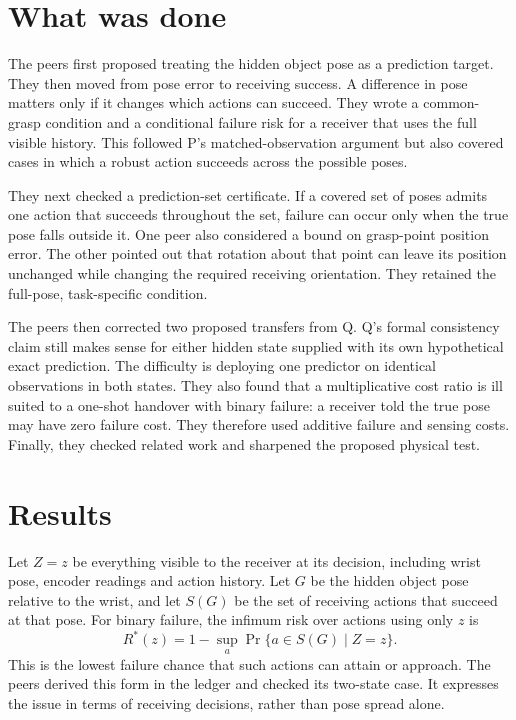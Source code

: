 \documentclass{article}
\begin{document}
\section{What was done}

The peers first proposed treating the hidden object pose as a prediction target. They then moved from
pose error to receiving success. A difference in pose matters only if it changes which actions can
succeed. They wrote a common-grasp condition and a conditional failure risk for a receiver that uses the
full visible history. This followed P's matched-observation argument but also covered cases in which a
robust action succeeds across the possible poses.

They next checked a prediction-set certificate. If a covered set of poses admits one action that succeeds
throughout the set, failure can occur only when the true pose falls outside it. One peer also considered
a bound on grasp-point position error. The other pointed out that rotation about that point can leave its
position unchanged while changing the required receiving orientation. They retained the full-pose,
task-specific condition.

The peers then corrected two proposed transfers from Q. Q's formal consistency claim still makes sense
for either hidden state supplied with its own hypothetical exact prediction. The difficulty is deploying
one predictor on identical observations in both states. They also found that a multiplicative cost ratio
is ill suited to a one-shot handover with binary failure: a receiver told the true pose may have zero
failure cost. They therefore used additive failure and sensing costs. Finally, they checked related work
and sharpened the proposed physical test.

\section{Results}

Let \(Z=z\) be everything visible to the receiver at its decision, including wrist pose, encoder readings
and action history. Let \(G\) be the hidden object pose relative to the wrist, and let \(S(G)\) be the
set of receiving actions that succeed at that pose. For binary failure, the infimum risk over actions
using only \(z\) is
\[
R^*(z)=1-\sup_a\Pr\{a\in S(G)\mid Z=z\}.
\]
This is the lowest failure chance that such actions can attain or approach.
The peers derived this form in the ledger and checked its two-state case. It expresses the issue in terms
of receiving decisions, rather than pose spread alone.
\end{document}
